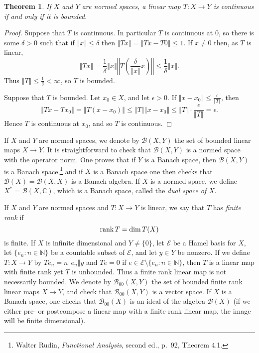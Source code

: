 \documentclass{article}
\newcommand{\rank}{\ensuremath\mathrm{rank\,}}
\newcommand{\norm}[1]{\left\Vert #1 \right\Vert}
\newtheorem{theorem}{Theorem}
\theoremstyle{definition}
\begin{document}
\begin{theorem}
If $X$ and $Y$ are normed spaces, a linear map $T:X \to Y$ is continuous if and only if it is bounded.
\end{theorem}
\begin{proof}
Suppose that $T$ is continuous. In particular $T$ is continuous at $0$, so there is some $\delta>0$ such that if $\norm{x} \leq \delta$ then
$\norm{Tx}=\norm{Tx-T0} \leq 1$. If $x \neq 0$ then, as $T$ is linear,
\[
\norm{Tx} = \frac{1}{\delta}\norm{x} \norm{T\left( \frac{\delta}{\norm{x}} x \right)}
\leq  \frac{1}{\delta} \norm{x}.
\]
Thus $\norm{T} \leq \frac{1}{\delta}<\infty$, so $T$ is bounded.

Suppose that $T$ is bounded. Let $x_0 \in X$, and let $\epsilon>0$. If $\norm{x-x_0} \leq \frac{\epsilon}{\norm{T}}$,
then
\[
\norm{Tx-Tx_0} = \norm{T(x-x_0)} \leq \norm{T} \norm{x-x_0} \leq \norm{T} \cdot  \frac{\epsilon}{\norm{T}} = \epsilon.
\]
Hence $T$ is continuous at $x_0$, and so $T$ is continuous.
\end{proof}

If $X$ and $Y$ are normed spaces,
we denote by $\mathscr{B}(X,Y)$ the set of bounded linear maps
$X \to Y$. It is straightforward to check that $\mathscr{B}(X,Y)$ is a normed space with the operator norm.
One proves that
if $Y$ is a Banach space, then $\mathscr{B}(X,Y)$ is a Banach space,\footnote{Walter Rudin, {\em Functional Analysis}, second ed., p.~92, Theorem 4.1.}
and if $X$ is a Banach space one then checks that $\mathscr{B}(X)=\mathscr{B}(X,X)$  is a Banach algebra. 
If $X$ is a normed space, we define $X^*=\mathscr{B}(X,\mathbb{C})$, which is a Banach space,  called the {\em dual space of $X$}.


If $X$ and $Y$ are normed spaces and $T:X \to Y$ is linear, we say that $T$ has {\em finite rank} if
\[
\rank T = \dim T(X)
\]
 is finite. If $X$ is infinite dimensional and $Y \neq \{0\}$,
let $\mathscr{E}$ be a Hamel basis for $X$, let $\{e_n: n \in \mathbb{N}\}$ be a countable subset of $\mathscr{E}$, and let $y \in Y$ be nonzero.
If we define
$T:X \to Y$ by $Te_n=n\norm{e_n}y$ and $Te=0$ if $e \in \mathscr{E} \setminus \{e_n:n \in \mathbb{N}\}$, then $T$ is a linear map with finite rank yet $T$ is unbounded.
Thus a finite rank linear map is not necessarily bounded. We denote by $\mathscr{B}_{00}(X,Y)$ the set of bounded finite rank linear maps $X \to Y$, and check that
$\mathscr{B}_{00}(X,Y)$ is a vector space.
If $X$ is a Banach space, one checks that $\mathscr{B}_{00}(X)$ is an ideal of the algebra $\mathscr{B}(X)$ (if we either pre- or postcompose a linear map with a finite rank
linear map, the image will be finite dimensional).
\end{document}
